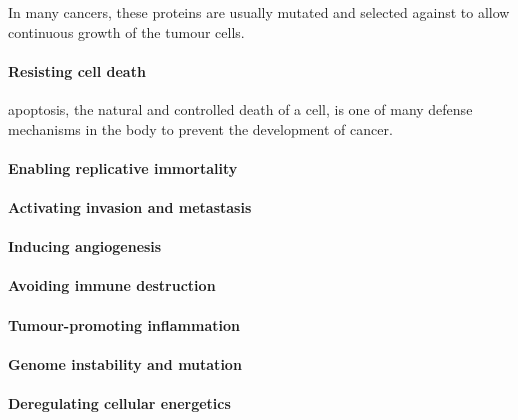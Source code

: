 In many cancers, these proteins are usually mutated and selected against to allow continuous growth of the tumour cells.

\paragraph{Resisting cell death}

\noindent
\Gls{apoptosis}, the natural and controlled death of a cell, is one of many defense mechanisms in the body to prevent the development of cancer.

\paragraph{Enabling replicative immortality}

\noindent


\paragraph{Activating invasion and metastasis}

\noindent


\paragraph{Inducing angiogenesis}

\noindent


\paragraph{Avoiding immune destruction}

\noindent


\paragraph{Tumour-promoting inflammation}

\noindent


\paragraph{Genome instability and mutation}

\noindent


\paragraph{Deregulating cellular energetics}

